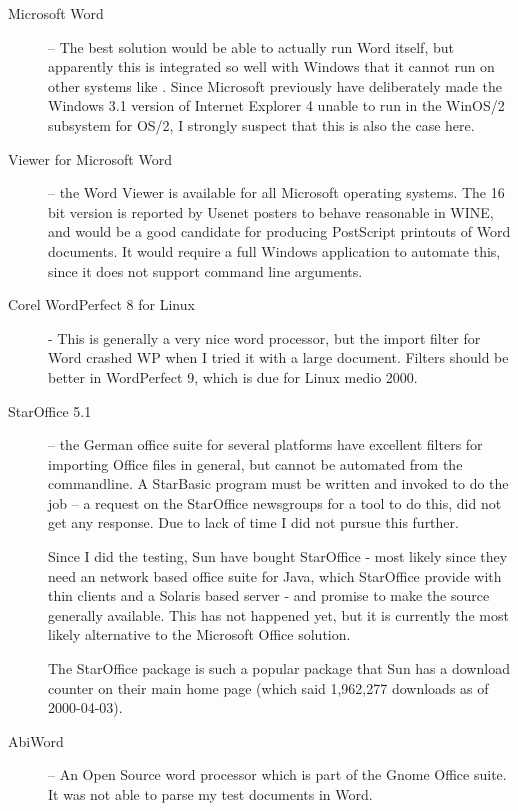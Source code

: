\begin{description}
\item[Microsoft Word] -- The best solution would be able to actually
  run Word itself, but apparently this is integrated so well with
  Windows that it cannot run on other systems like
  .  Since Microsoft previously
  have deliberately made the Windows 3.1 version of Internet Explorer
  4 unable to run in the WinOS/2 subsystem for OS/2, I strongly
  suspect that this is also the case here.
  
\item[Viewer for Microsoft Word] -- the Word Viewer is available for
  all Microsoft operating systems.  The 16 bit version is reported by
  Usenet posters to behave reasonable in WINE, and would be a good
  candidate for producing PostScript printouts of Word documents.  It
  would require a full Windows application to automate this, since it
  does not support command line arguments.

\item[Corel WordPerfect 8 for Linux] - This is generally a very nice
  word processor, but the import filter for Word crashed WP when I
  tried it with a large document.  Filters should be better in
  WordPerfect 9, which is due for Linux medio 2000.
  
\item[StarOffice 5.1] -- the German office suite for several platforms
  have excellent filters for importing Office files in general, but
  cannot be automated from the commandline.  A StarBasic program must
  be written and invoked to do the job -- a request on the StarOffice
  newsgroups for a tool to do this, did not get any response.  Due to
  lack of time I did not pursue this further.
  
  Since I did the testing, Sun have bought StarOffice - most likely
  since they need an network based office suite for Java, which
  StarOffice provide with thin clients and a Solaris based server -
  and promise to make the source generally available.  This has not
  happened yet, but it is currently the most likely alternative to the
  Microsoft Office solution.
  
  The StarOffice package is such a popular package that Sun has a
  download counter on their main home page (which said 1,962,277
  downloads as of 2000-04-03).
  
  
\item[AbiWord] -- An Open Source word processor which is part of the
  Gnome Office suite.  It was not able to parse my test documents in
  Word.
  

\end{description}

